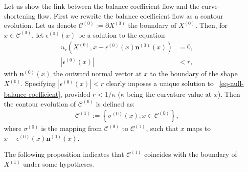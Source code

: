 \documentclass{siamart220329}
\newcommand{\C}{\mathcal{C}} %
\begin{document}
Let us show the link between the balance coefficient flow and the
curve-shortening flow. First we rewrite the balance coefficient flow
as a contour evolution. Let us denote $\C^{(0)} := \partial
X^{(0)}$ the boundary of $X^{(0)}$. Then, for $x \in \C^{(0)}$,
let $\epsilon^{(0)}(x)$ be a solution to the equation
\begin{align} \label{eq-null-balance-coefficient}
  u_r(X^{(0)}, x +\epsilon^{(0)}(x)
  \mathbf{n}^{(0)}(x)) & = 0, \\
  |\epsilon^{(0)}(x)| & < r, \nonumber
\end{align}
with $\mathbf{n}^{(0)}(x)$ the outward normal vector at $x$ to
the boundary of the shape $X^{(0)}$. Specifying
$|\epsilon^{(0)}(x)| < r$ clearly imposes a unique solution to
~\cref{eq-null-balance-coefficient}, provided $r < 1/\kappa$ ($\kappa$ being the 
curvature value at $x$). Then the
contour evolution of $\C^{(0)}$ is defined as:
\begin{align} \label{eq-balance-coefficient-contour-flow}
  \C^{(1)} := \left\{ \sigma^{(0)}(x), x \in \C^{(0)} \right\},
\end{align}
where $\sigma^{(0)}$ is the mapping from $\C^{(0)}$ to $\C^{(1)}$, such that $x$ maps to $x+\epsilon^{(0)}(x) \mathbf{n}^{(0)}(x)$.

The following proposition indicates that $\C^{(1)}$ coincides with
the boundary of $X^{(1)}$ under some hypotheses.
\end{document}
